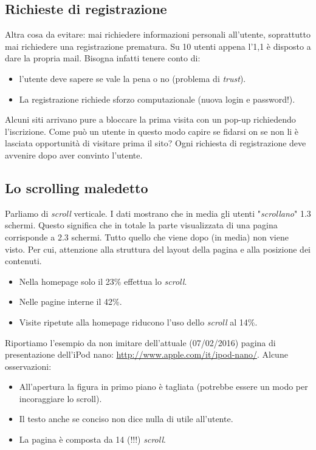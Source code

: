 		\subsection{Richieste di registrazione}
			Altra cosa da evitare: mai richiedere informazioni personali all'utente, soprattutto mai richiedere una registrazione prematura. Su 10 utenti appena l'1,1 è disposto a dare la propria mail.	Bisogna infatti tenere conto di:
			\begin{itemize}
				\item l'utente deve sapere se vale la pena o no (problema di \emph{trust}).
				\item La registrazione richiede sforzo computazionale (nuova login e password!).
			\end{itemize}
			Alcuni siti arrivano pure a bloccare la prima visita con un pop-up richiedendo l'iscrizione. Come può un utente in questo modo capire se fidarsi on se non li è lasciata opportunità di visitare prima il sito? Ogni richiesta di registrazione deve avvenire dopo aver convinto l'utente.
			
		
		\subsection{Lo scrolling maledetto}
			Parliamo di \emph{scroll} verticale. I dati mostrano che in media gli utenti "\emph{scrollano}" 1.3 schermi. Questo significa che in totale la parte visualizzata di una pagina corrisponde a 2.3 schermi. Tutto quello che viene dopo (in media) non viene visto. Per cui, attenzione alla struttura del layout della pagina e alla posizione dei contenuti.
			\begin{itemize}
				\item Nella homepage solo il 23\% effettua lo \emph{scroll}.
				\item Nelle pagine interne il 42\%.
				\item Visite ripetute alla homepage riducono l'uso dello \emph{scroll} al 14\%.
			\end{itemize}
			Riportiamo l'esempio da non imitare dell'attuale (07/02/2016) pagina di presentazione dell'iPod nano: \url{http://www.apple.com/it/ipod-nano/}. Alcune osservazioni:
			\begin{itemize}
				\item All'apertura la figura in primo piano è tagliata (potrebbe essere un modo per incoraggiare lo scroll).
				\item Il testo anche se conciso non dice nulla di utile all'utente.
				\item La pagina è composta da 14 (!!!) \emph{scroll}.
			\end{itemize}
			
